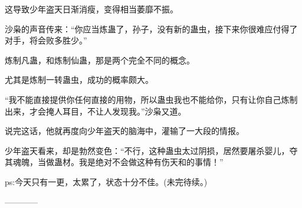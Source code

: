 \begin{this_body}
这导致少年盗天日渐消瘦，变得相当萎靡不振。

沙枭的声音传来：“你应当炼蛊了，孙子，没有新的蛊虫，接下来你很难应付得了对手，将会败多胜少。”

炼制凡蛊，和炼制仙蛊，那是两个完全不同的概念。

尤其是炼制一转蛊虫，成功的概率颇大。

“我不能直接提供你任何直接的用物，所以蛊虫我也不能给你，只有让你自己炼制出来，才会掩人耳目，不让人发现我。”沙枭又道。

说完这话，他就再度向少年盗天的脑海中，灌输了一大段的情报。

少年盗天看来，却是勃然变色：“不行，这种蛊虫太过阴损，居然要屠杀婴儿，夺其魂魄，当做蛊材。我是绝对不会做这种有伤天和的事情！”

ps:今天只有一更，太累了，状态十分不佳。(未完待续。)

------------

\end{this_body}

